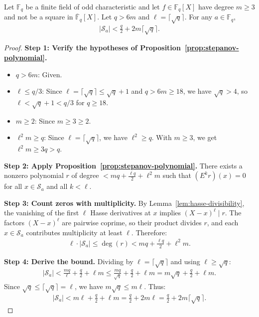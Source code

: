 \begin{lemma}\label{lem:riemann-hypothesis-stepanov-bound} \leanok {}
  Let $\mathbb{F}_q$ be a finite field of odd characteristic and let $f \in \mathbb{F}_q[X]$ have degree $m \geq 3$ and not be a square in $\overline{\mathbb{F}}_q[X]$. Let $q > 6m$ and $\ell = \lceil\sqrt{q}\rceil$. For any $a \in \mathbb{F}_q$,
  \begin{align*}
    |\mathcal{S}_a| < \frac{q}{2} + 2m\lceil\sqrt{q}\rceil.
  \end{align*}
\end{lemma}
\begin{proof} \leanok
  \textbf{Step 1: Verify the hypotheses of Proposition~\ref{prop:stepanov-polynomial}.}
  \begin{itemize}
    \item $q > 6m$: Given.
    \item $\ell \leq q/3$: Since $\ell = \lceil\sqrt{q}\rceil \leq \sqrt{q} + 1$ and $q > 6m \geq 18$, we have $\sqrt{q} > 4$, so $\ell < \sqrt{q} + 1 < q/3$ for $q \geq 18$.
    \item $m \geq 2$: Since $m \geq 3 \geq 2$.
    \item $\ell^2 m \geq q$: Since $\ell = \lceil\sqrt{q}\rceil$, we have $\ell^2 \geq q$. With $m \geq 3$, we get $\ell^2 m \geq 3q > q$.
  \end{itemize}

  \textbf{Step 2: Apply Proposition~\ref{prop:stepanov-polynomial}.} There exists a nonzero polynomial $r$ of degree $< mq + \frac{\ell q}{2} + \ell^2 m$ such that $(E^k r)(x) = 0$ for all $x \in \mathcal{S}_a$ and all $k < \ell$.

  \textbf{Step 3: Count zeros with multiplicity.} By Lemma~\ref{lem:hasse-divisibility}, the vanishing of the first $\ell$ Hasse derivatives at $x$ implies $(X-x)^\ell \mid r$. The factors $(X-x)^\ell$ are pairwise coprime, so their product divides $r$, and each $x \in \mathcal{S}_a$ contributes multiplicity at least $\ell$. Therefore:
  \begin{align*}
    \ell \cdot |\mathcal{S}_a| \leq \deg(r) < mq + \tfrac{\ell q}{2} + \ell^2 m.
  \end{align*}

  \textbf{Step 4: Derive the bound.} Dividing by $\ell = \lceil\sqrt{q}\rceil$ and using $\ell \geq \sqrt{q}$:
  \begin{align*}
    |\mathcal{S}_a| < \frac{mq}{\ell} + \frac{q}{2} + \ell m \leq \frac{mq}{\sqrt{q}} + \frac{q}{2} + \ell m = m\sqrt{q} + \frac{q}{2} + \ell m.
  \end{align*}
  Since $\sqrt{q} \leq \lceil\sqrt{q}\rceil = \ell$, we have $m\sqrt{q} \leq m\ell$. Thus:
  \begin{align*}
    |\mathcal{S}_a| < m\ell + \frac{q}{2} + \ell m = \frac{q}{2} + 2m\ell = \frac{q}{2} + 2m\lceil\sqrt{q}\rceil.
  \end{align*}
\end{proof}

